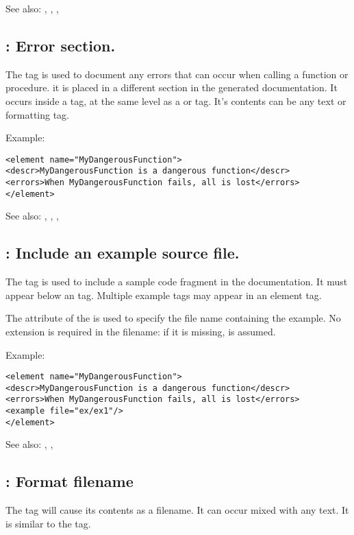 See also: , , , 

\subsection{ : Error section.}
\label{tag:errors}
The  tag is used to document any errors that can occur when
calling a function or procedure. it is placed in a different section in the
generated documentation. It occurs inside a  tag, at the same
level as a  or  tag. It's contents can be any
text or formatting tag.

Example:
\begin{verbatim}
<element name="MyDangerousFunction">
<descr>MyDangerousFunction is a dangerous function</descr>
<errors>When MyDangerousFunction fails, all is lost</errors>
</element>
\end{verbatim}

See also: , , , 

\subsection{ : Include an example source file.}
\label{tag:example}
The  tag is used to include a sample code fragment in the
documentation. It must appear below an  tag. Multiple example
tags may appear in an element tag.

The  attribute of the is used to specify the file name containing
the example. No extension is required in the filename:  if it is missing, 
 is assumed.

Example:
\begin{verbatim}
<element name="MyDangerousFunction">
<descr>MyDangerousFunction is a dangerous function</descr>
<errors>When MyDangerousFunction fails, all is lost</errors>
<example file="ex/ex1"/>
</element>
\end{verbatim}

See also: , , 

\subsection{ : Format filename}
\label{tag:file}
The  tag will cause its contents as a filename. It can
occur mixed with any text. It is similar to the  tag.

